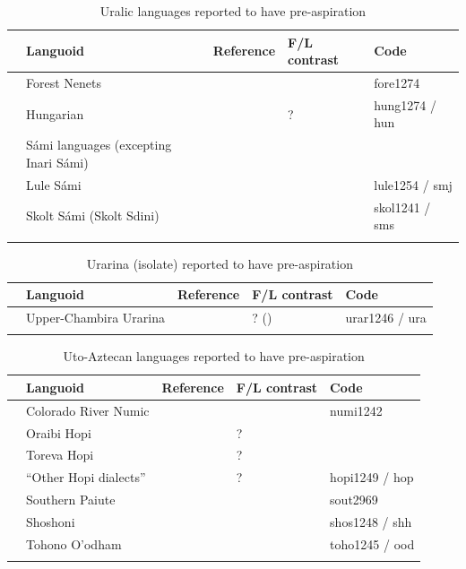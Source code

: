 \documentclass[output=paper]{langscibook}
\begin{document}
\begin{paperappendix}
\begin{table}
\begin{tabularx}{\textwidth}{@{}l@{}QQQl}
\lsptoprule
& Languoid & Reference & F/L contrast & Code\\
\midrule
  & Forest Nenets & \citet{Clayton2010} & \citet{Salminen2007} & fore1274\\
& Hungarian & \citet[761]{Gráczi2011} & ? \citep{Gráczi2011} & hung1274 / hun\\
& Sámi languages (excepting Inari Sámi) & \citet{iosad2022preaspirasjon} &  & \\
& Lule Sámi & \citet{Engstrand1987} &  & lule1254 / smj\\
& Skolt Sámi (Skolt Sdini) & \citet{McRobbie-Utasi1992} & \citet{McRobbie-Utasi1992} & skol1241 / sms\\
\lspbottomrule
\end{tabularx}
\caption{Uralic languages reported to have pre-aspiration}
\label{tab:key:15}
\end{table}


\begin{table}
\begin{tabularx}{\textwidth}{@{}l@{}QQQl}
\lsptoprule
& Languoid & Reference & F/L contrast & Code\\
\midrule
  & Upper-Chambira Urarina &   \citet{Elias-UlloaAramburú2021} & ? (\citealt{Elias-UlloaAramburú2021}) & urar1246 / ura\\
\lspbottomrule
\end{tabularx}
\caption{Urarina (isolate) reported to have pre-aspiration}
\label{tab:key:16}
\end{table}


\begin{table}
\begin{tabularx}{\textwidth}{@{}l@{}QQQl}
\lsptoprule
& Languoid & Reference & F/L contrast & Code\\
\midrule
  & Colorado River Numic & \citet{MillerEtAl2005} &  & numi1242\\
& Oraibi Hopi & \citet{Silverman2003} & ? \citep[589-590]{Silverman2003} & \\
& Toreva Hopi & \citet{Silverman2003} & ? \citep[589-590]{Silverman2003} & \\
& “Other Hopi dialects” & \citet{Silverman2003} & ? \citep[589-590]{Silverman2003} & hopi1249 / hop\\
& Southern Paiute & \citet{Elzinga2014} &  & sout2969\\
& Shoshoni & \citet{Elzinga2014} &  & shos1248 / shh\\
& Tohono O’odham & \citet{Clayton2010} &  & toho1245 / ood\\
\lspbottomrule
\end{tabularx}
\caption{Uto-Aztecan languages reported to have pre-aspiration}
\label{tab:key:17}
\end{table}



\end{paperappendix}
\end{document}
